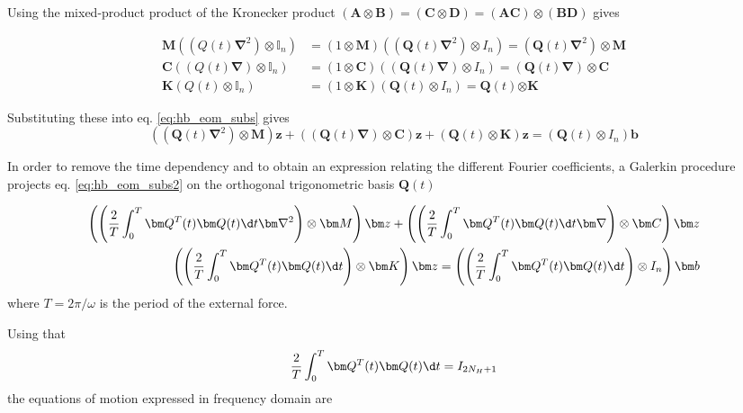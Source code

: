 Using the mixed-product product of the Kronecker product $(\bm A \otimes \bm
B)=(\bm C \otimes \bm D) = (\bm A \bm C) \otimes (\bm B \bm D)$ gives


\begin{equation}
  \begin{aligned}
    \bm M((Q(t)\bm\nabla^2) \otimes \mathbb{I}_n) &=
    (1\otimes \bm M) ((\bm Q(t) \bm \nabla^2)\otimes I_n ) =
    (\bm Q(t)\bm \nabla^2)\otimes \bm M \\
    \bm C((Q(t)\bm\nabla) \otimes \mathbb{I}_n) &=
    (1\otimes \bm C) ((\bm Q(t) \bm \nabla)\otimes I_n ) =
    (\bm Q(t)\bm \nabla)\otimes \bm C \\
    \bm K(Q(t) \otimes \mathbb{I}_n) &=
    (1\otimes \bm K) (\bm Q(t) \otimes I_n ) =
    \bm Q(t)\bm \otimes \bm K
  \end{aligned}
\end{equation}

Substituting these into eq. \eqref{eq:hb_eom_subs} gives
\begin{equation}
  ((\bm Q(t)\bm \nabla^2) \otimes \bm M)\bm z +
  ((\bm Q(t)\bm \nabla) \otimes \bm C)\bm z +
  (\bm Q(t) \otimes \bm K)\bm z =
  (\bm Q(t) \otimes I_n) \bm b
  \label{eq:hb_eom_subs2}
\end{equation}

In order to remove the time dependency and to obtain an expression relating the
different Fourier coefficients, a Galerkin procedure projects eq.
\eqref{eq:hb_eom_subs2} on the orthogonal trigonometric basis $\bm Q(t)$

\begin{equation}
  \begin{aligned}
    \left( \left( \frac{2}{T}\int^T_0 \bm Q^T(t) \bm Q(t) \d t \bm \nabla^2
      \right) \otimes \bm M \right) \bm z +
    \left( \left( \frac{2}{T}\int^T_0 \bm Q^T(t) \bm Q(t) \d t \bm \nabla
      \right) \otimes \bm C \right) \bm z \\
    \left( \left( \frac{2}{T}\int^T_0 \bm Q^T(t) \bm Q(t) \d t
      \right) \otimes \bm K \right) \bm z =
    \left( \left( \frac{2}{T}\int^T_0 \bm Q^T(t) \bm Q(t) \d t
      \right) \otimes I_n \right) \bm b
  \end{aligned}
\end{equation}
where $T=2\pi / \omega$ is the period of the external force.

Using that
\begin{equation}
  \frac{2}{T}\int^T_0 \bm Q^T(t) \bm Q(t) \d t = I_{2N_H+1}
\end{equation}
the equations of motion expressed in frequency domain are

